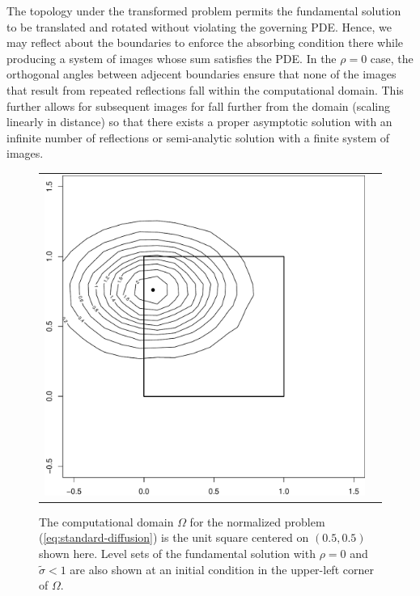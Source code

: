 \documentclass[10pt]{article}
\begin{document}
The topology under the transformed problem permits the fundamental
solution to be translated and rotated without violating the governing
PDE. Hence, we may reflect about the boundaries to enforce the
absorbing condition there while producing a system of images whose sum
satisfies the PDE. In the $\rho=0$ case, the orthogonal angles between
adjecent boundaries ensure that none of the images that result from
repeated reflections fall within the computational domain. This
further allows for subsequent images for fall further from the domain
(scaling linearly in distance) so that there exists a proper
asymptotic solution with an infinite number of reflections or
semi-analytic solution with a finite system of images.
\begin{figure}
  \centering
  \begin{tabular}{cc}
    \begin{minipage}{0.40\textwidth}
      \centering
      \includegraphics[width=1\linewidth]{illustration-rho-0-normalized.pdf}
      \caption{The computational domain $\Omega$ for the normalized
        problem (\ref{eq:standard-diffusion}) is the unit square
        centered on $(0.5,0.5)$ shown here. Level sets of the
        fundamental solution with $\rho = 0$ and $\tilde{\sigma} < 1$
        are also shown at an initial condition in the upper-left
        corner of $\Omega$.}

\end{minipage}
\end{tabular}
\end{figure}
\end{document}
